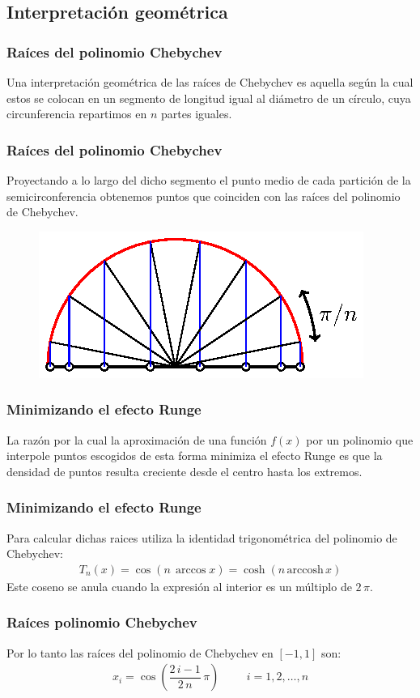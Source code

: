 \subsection{Interpretación geométrica}
\begin{frame}
\frametitle{Raíces del polinomio Chebychev}
Una interpretación geométrica de las raíces de Chebychev es aquella según la cual estos se colocan en un segmento de longitud igual al diámetro de un círculo, cuya circunferencia repartimos en $n$ partes iguales.
\end{frame}
\begin{frame}
\frametitle{Raíces del polinomio Chebychev}
Proyectando a lo largo del dicho segmento el punto medio de cada partición de la semicirconferencia obtenemos puntos que coinciden con las raíces del polinomio de Chebychev.
\begin{figure}
    \centering
    \includegraphics[scale=1]{Imagenes/Nodos_Chebychev_01.eps}
\end{figure}
\end{frame}
\begin{frame}
\frametitle{Minimizando el efecto Runge}
La razón por la cual la aproximación de una función $f(x)$ por un polinomio que interpole puntos escogidos de esta forma minimiza el efecto Runge es que la densidad de puntos resulta creciente desde el centro hasta los extremos.
\end{frame}
\begin{frame}
\frametitle{Minimizando el efecto Runge}
Para calcular dichas raices utiliza la identidad trigonométrica del polinomio de Chebychev:
\begin{align*}
T_{n}(x) = \cos (n \, \arccos x) = \cosh (n \, \mbox{arccosh} \, x)
\end{align*}
\pause
Este coseno se anula cuando la expresión al interior es un múltiplo de $2 \, \pi$.
\end{frame}
\begin{frame}
\frametitle{Raíces polinomio Chebychev}
Por lo tanto las raíces del polinomio de Chebychev en $[-1,1]$ son:
\begin{align*}
x_{i} = \cos \left( \dfrac{2 \, i - 1}{2 \, n} \, \pi \right) \hspace{1cm} i = 1, 2, \ldots, n
\end{align*}
\end{frame}
